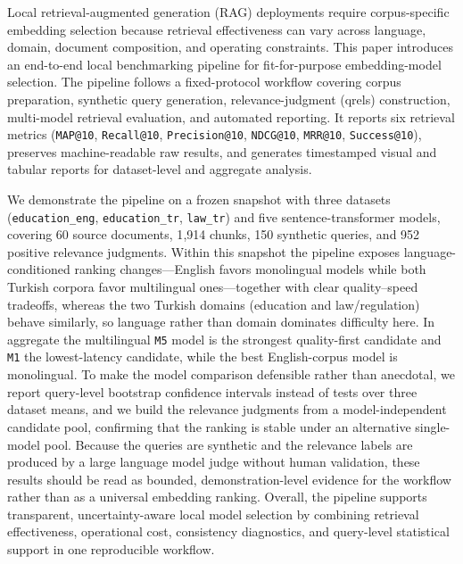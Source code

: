 Local retrieval-augmented generation (RAG) deployments require corpus-specific embedding selection because retrieval effectiveness can vary across language, domain, document composition, and operating constraints. This paper introduces an end-to-end local benchmarking pipeline for fit-for-purpose embedding-model selection. The pipeline follows a fixed-protocol workflow covering corpus preparation, synthetic query generation, relevance-judgment (qrels) construction, multi-model retrieval evaluation, and automated reporting. It reports six retrieval metrics (\texttt{MAP@10}, \texttt{Recall@10}, \texttt{Precision@10}, \texttt{NDCG@10}, \texttt{MRR@10}, \texttt{Success@10}), preserves machine-readable raw results, and generates timestamped visual and tabular reports for dataset-level and aggregate analysis.

We demonstrate the pipeline on a frozen snapshot with three datasets (\texttt{education\_eng}, \texttt{education\_tr}, \texttt{law\_tr}) and five sentence-transformer models, covering 60 source documents, 1{,}914 chunks, 150 synthetic queries, and 952 positive relevance judgments. Within this snapshot the pipeline exposes language-conditioned ranking changes---English favors monolingual models while both Turkish corpora favor multilingual ones---together with clear quality--speed tradeoffs, whereas the two Turkish domains (education and law/regulation) behave similarly, so language rather than domain dominates difficulty here. In aggregate the multilingual \texttt{M5} model is the strongest quality-first candidate and \texttt{M1} the lowest-latency candidate, while the best English-corpus model is monolingual. To make the model comparison defensible rather than anecdotal, we report query-level bootstrap confidence intervals instead of tests over three dataset means, and we build the relevance judgments from a model-independent candidate pool, confirming that the ranking is stable under an alternative single-model pool. Because the queries are synthetic and the relevance labels are produced by a large language model judge without human validation, these results should be read as bounded, demonstration-level evidence for the workflow rather than as a universal embedding ranking. Overall, the pipeline supports transparent, uncertainty-aware local model selection by combining retrieval effectiveness, operational cost, consistency diagnostics, and query-level statistical support in one reproducible workflow.
